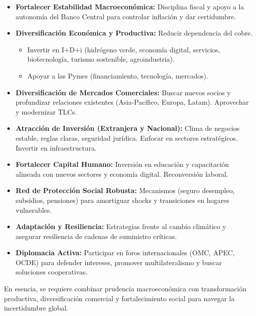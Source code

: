 \documentclass[12pt, a4paper]{article}
\begin{document}
\begin{itemize}
    \item \textbf{Fortalecer Estabilidad Macroeconómica:} Disciplina fiscal y apoyo a la autonomía del Banco Central para controlar inflación y dar certidumbre.
    \item \textbf{Diversificación Económica y Productiva:} Reducir dependencia del cobre.
        \begin{itemize}
            \item Invertir en I+D+i (hidrógeno verde, economía digital, servicios, biotecnología, turismo sostenible, agroindustria).
            \item Apoyar a las Pymes (financiamiento, tecnología, mercados).
        \end{itemize}
    \item \textbf{Diversificación de Mercados Comerciales:} Buscar nuevos socios y profundizar relaciones existentes (Asia-Pacífico, Europa, Latam). Aprovechar y modernizar TLCs.
    \item \textbf{Atracción de Inversión (Extranjera y Nacional):} Clima de negocios estable, reglas claras, seguridad jurídica. Enfocar en sectores estratégicos. Invertir en infraestructura.
    \item \textbf{Fortalecer Capital Humano:} Inversión en educación y capacitación alineada con nuevos sectores y economía digital. Reconversión laboral.
    \item \textbf{Red de Protección Social Robusta:} Mecanismos (seguro desempleo, subsidios, pensiones) para amortiguar shocks y transiciones en hogares vulnerables.
    \item \textbf{Adaptación y Resiliencia:} Estrategias frente al cambio climático y asegurar resiliencia de cadenas de suministro críticas.
    \item \textbf{Diplomacia Activa:} Participar en foros internacionales (OMC, APEC, OCDE) para defender intereses, promover multilateralismo y buscar soluciones cooperativas.
\end{itemize}

En esencia, se requiere combinar prudencia macroeconómica con transformación productiva, diversificación comercial y fortalecimiento social para navegar la incertidumbre global.
\end{document}
